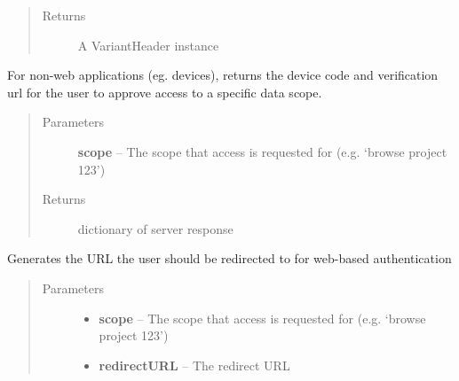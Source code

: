 \documentclass[letterpaper,10pt,english]{sphinxmanual}
\begin{document}
\begin{fulllineitems}
\begin{fulllineitems}
\begin{quote}
\begin{description}
\begin{itemize}
\end{itemize}

\item[{Returns}] \leavevmode
A VariantHeader instance

\end{description}\end{quote}

\end{fulllineitems}


\begin{fulllineitems}
\label{Available modules:BaseSpacePy.api.BaseSpaceAPI.BaseSpaceAPI.getVerificationCode}
For non-web applications (eg. devices), returns the device code 
and verification url for the user to approve access to a specific data scope.
\begin{quote}\begin{description}
\item[{Parameters}] \leavevmode
\textbf{scope} -- The scope that access is requested for (e.g. `browse project 123')

\item[{Returns}] \leavevmode
dictionary of server response

\end{description}\end{quote}

\end{fulllineitems}


\begin{fulllineitems}
\label{Available modules:BaseSpacePy.api.BaseSpaceAPI.BaseSpaceAPI.getWebVerificationCode}
Generates the URL the user should be redirected to for web-based authentication
\begin{quote}\begin{description}
\item[{Parameters}] \leavevmode\begin{itemize}
\item {} 
\textbf{scope} -- The scope that access is requested for (e.g. `browse project 123')

\item {} 
\textbf{redirectURL} -- The redirect URL


\end{itemize}
\end{description}
\end{quote}
\end{fulllineitems}
\end{fulllineitems}
\end{document}
